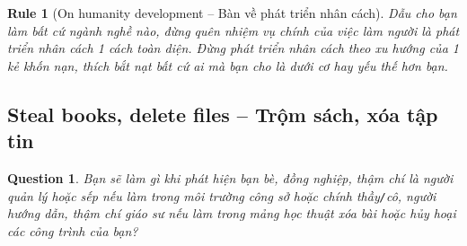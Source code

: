 \documentclass[12pt,twoside]{book}
\newtheorem{question}{Question}
\newtheorem{Rule}{Rule}
\begin{document}
\begin{Rule}[On humanity development -- Bàn về phát triển nhân cách]
	Dẫu cho bạn làm bất cứ ngành nghề nào, đừng quên nhiệm vụ chính của việc làm người là phát triển nhân cách 1 cách toàn diện. Đừng phát triển nhân cách theo xu hướng của 1 kẻ khốn nạn, thích bắt nạt bất cứ ai mà bạn cho là dưới cơ hay yếu thế hơn bạn.
\end{Rule}

\subsection{Steal books, delete files -- Trộm sách, xóa tập tin}

\begin{question}
	Bạn sẽ làm gì khi phát hiện bạn bè, đồng nghiệp, thậm chí là người quản lý hoặc sếp nếu làm trong môi trường công sở hoặc chính thầy{\tt/}cô, người hướng dẫn, thậm chí giáo sư nếu làm trong mảng học thuật xóa bài hoặc hủy hoại các công trình của bạn?
\end{question}
\end{document}
